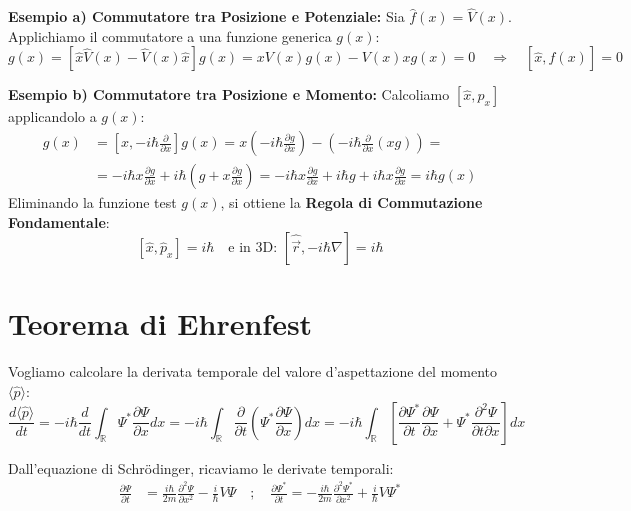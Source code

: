 \documentclass[11pt, a4paper]{article}
\begin{document}
\noindent
\textbf{Esempio a) Commutatore tra Posizione e Potenziale:} %
Sia $\hat{f}(x) = \hat{V}(x)$. Applichiamo il commutatore a una funzione generica $g(x)$: %
\begin{equation*}
    [\hat{x}, \hat{V}(x)]g(x) = [\hat{x}\hat{V}(x) - \hat{V}(x)\hat{x}]g(x) = x V(x) g(x) - V(x) x g(x) = 0 \quad \Rightarrow \quad \boxed{[\hat{x}, \hat{f}(x)] = 0} %
\end{equation*}

\noindent
\textbf{Esempio b) Commutatore tra Posizione e Momento:} %
Calcoliamo $[\hat{x}, \hat{p}_x]$ applicandolo a $g(x)$: %
\begin{align*}
    [\hat{x}, \hat{p}_x]g(x) &= \left[ x, -i\hbar \frac{\partial}{\partial x} \right] g(x) = x \left( -i\hbar \frac{\partial g}{\partial x} \right) - \left( -i\hbar \frac{\partial}{\partial x}(xg) \right) = \\ %
                             &= -i\hbar x \frac{\partial g}{\partial x} + i\hbar \left( g + x \frac{\partial g}{\partial x} \right) = -i\hbar x \frac{\partial g}{\partial x} + i\hbar g + i\hbar x \frac{\partial g}{\partial x} = i\hbar g(x) %
\end{align*}
Eliminando la funzione test $g(x)$, si ottiene la \textbf{Regola di Commutazione Fondamentale}: %
\begin{equation}
    \boxed{ [\hat{x}, \hat{p}_x] = i\hbar } \quad \text{e in 3D: } [\hat{\vec{r}}, -i\hbar\nabla] = i\hbar %
\end{equation}

\section{Teorema di Ehrenfest} %

Vogliamo calcolare la derivata temporale del valore d'aspettazione del momento $\langle \hat{p} \rangle$: %
\begin{equation*}
    \frac{d\langle \hat{p} \rangle}{dt} = -i\hbar \frac{d}{dt} \int_{\mathbb{R}} \Psi^* \frac{\partial \Psi}{\partial x} dx = -i\hbar \int_{\mathbb{R}} \frac{\partial}{\partial t} \left( \Psi^* \frac{\partial \Psi}{\partial x} \right) dx = -i\hbar \int_{\mathbb{R}} \left[ \frac{\partial \Psi^*}{\partial t} \frac{\partial \Psi}{\partial x} + \Psi^* \frac{\partial^2 \Psi}{\partial t \partial x} \right] dx %
\end{equation*}

Dall'equazione di Schrödinger, ricaviamo le derivate temporali: %
\begin{align*}
    \frac{\partial \Psi}{\partial t} &= \frac{i\hbar}{2m} \frac{\partial^2 \Psi}{\partial x^2} - \frac{i}{\hbar} V\Psi \quad ; \quad \frac{\partial \Psi^*}{\partial t} = -\frac{i\hbar}{2m} \frac{\partial^2 \Psi^*}{\partial x^2} + \frac{i}{\hbar} V\Psi^* %
\end{align*}
\end{document}
